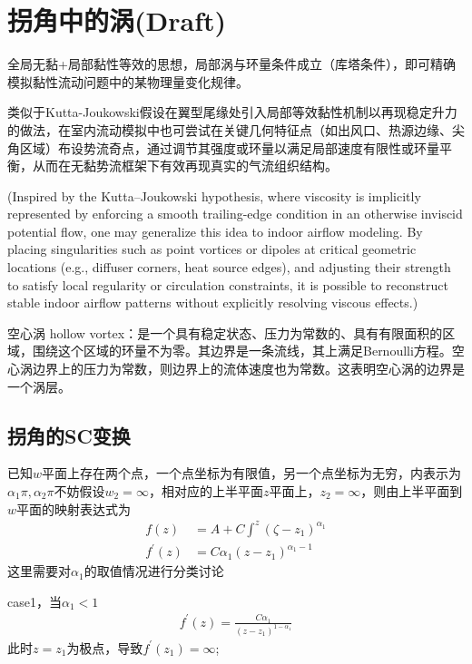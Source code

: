 \section{拐角中的涡(Draft)}
全局无黏+局部黏性等效的思想，局部涡与环量条件成立（库塔条件），即可精确模拟黏性流动问题中的某物理量变化规律。

类似于Kutta-Joukowski假设在翼型尾缘处引入局部等效黏性机制以再现稳定升力的做法，在室内流动模拟中也可尝试在关键几何特征点（如出风口、热源边缘、尖角区域）布设势流奇点，通过调节其强度或环量以满足局部速度有限性或环量平衡，从而在无黏势流框架下有效再现真实的气流组织结构。

(Inspired by the Kutta–Joukowski hypothesis, where viscosity is implicitly represented by enforcing a smooth trailing-edge condition in an otherwise inviscid potential flow, one may generalize this idea to indoor airflow modeling. By placing singularities such as point vortices or dipoles at critical geometric locations (e.g., diffuser corners, heat source edges), and adjusting their strength to satisfy local regularity or circulation constraints, it is possible to reconstruct stable indoor airflow patterns without explicitly resolving viscous effects.)

空心涡 hollow vortex：是一个具有稳定状态、压力为常数的、具有有限面积的区域，围绕这个区域的环量不为零。其边界是一条流线，其上满足Bernoulli方程。空心涡边界上的压力为常数，则边界上的流体速度也为常数。这表明空心涡的边界是一个涡层。



\subsection{拐角的SC变换}

已知$w$平面上存在两个点，一个点坐标为有限值，另一个点坐标为无穷，内表示为$\alpha_{1}\pi,\alpha_{2}\pi$不妨假设$w_{2}=\infty$，相对应的上半平面$z$平面上，$z_{2}=\infty$，则由上半平面到$w$平面的映射表达式为
\begin{align*}
    f(z)&=A+C\int^{z}(\zeta-z_{1})^{\alpha_{1}}\\
    f^{'}(z)&=C\alpha_{1}(z-z_{1})^{\alpha_{1}-1}
\end{align*}
这里需要对$\alpha_{1}$的取值情况进行分类讨论

case1，当$\alpha_{1}<1$
\begin{align*}
    f^{'}(z)=\frac{C\alpha_{1}}{(z-z_{1})^{1-\alpha_{1}}}
\end{align*}
此时$z=z_{1}$为极点，导致$f^{'}(z_{1})=\infty$;

